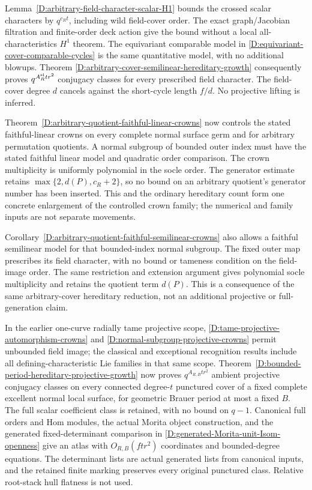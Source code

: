 Lemma~\ref{D:arbitrary-field-character-scalar-H1} bounds the crossed
scalar characters by $q^{c_Rt}$, including wild field-cover order.
The exact graph/Jacobian filtration and finite-order deck action
give the bound without a local all-characteristics $H^1$ theorem.
The equivariant comparable model in
\ref{D:equivariant-cover-comparable-cycles} is the same quantitative
model, with no additional blowups. Theorem
\ref{D:arbitrary-cover-semilinear-hereditary-growth} consequently
proves $q^{A_R^{\rm sl}tr^2}$ conjugacy classes for every prescribed
field character. The field-cover degree $d$ cancels against the
short-cycle length $f/d$. No projective lifting is inferred.

Theorem~\ref{D:arbitrary-quotient-faithful-linear-crowns} now controls
the stated faithful-linear crowns on every complete normal surface
germ and for arbitrary permutation quotients. A normal subgroup of
bounded outer index must have the stated faithful linear model and
quadratic order comparison. The crown multiplicity is uniformly
polynomial in the socle order. The generator estimate retains
$\max\{2,d(P),c_R+2\}$, so no bound on an arbitrary quotient's
generator number has been inserted. This and the ordinary hereditary
count form one concrete enlargement of the controlled crown family;
the numerical and family inputs are not separate movements.

Corollary~\ref{D:arbitrary-quotient-faithful-semilinear-crowns}
also allows a faithful semilinear model for that bounded-index
normal subgroup. The fixed outer map prescribes its field
character, with no bound or tameness condition on the field-image
order. The same restriction and extension argument gives polynomial
socle multiplicity and retains the quotient term $d(P)$.
This is a consequence of the same arbitrary-cover hereditary
reduction, not an additional projective or full-generation claim.

In the earlier one-curve radially tame projective scope,
\ref{D:tame-projective-automorphism-crowns} and
\ref{D:normal-subgroup-projective-crowns} permit unbounded field
image; the classical and exceptional recognition results include
all defining-characteristic Lie families in that same scope.
Theorem~\ref{D:bounded-period-hereditary-projective-growth}
now proves $q^{A_{R,B}tr^2}$ ambient projective conjugacy classes
on every connected degree-$t$ punctured cover of a fixed complete
excellent normal local surface, for geometric Brauer period at
most a fixed $B$. The full scalar coefficient class is retained,
with no bound on $q-1$. Canonical full orders and Hom modules,
the actual Morita object construction, and the generated
fixed-determinant comparison in
\ref{D:generated-Morita-unit-Isom-openness} give an atlas with
$O_{R,B}(ftr^2)$ coordinates and bounded-degree equations.
The determinant lists are actual generated lists from canonical
inputs, and the retained finite marking preserves every original
punctured class. Relative root-stack hull flatness is not used.

